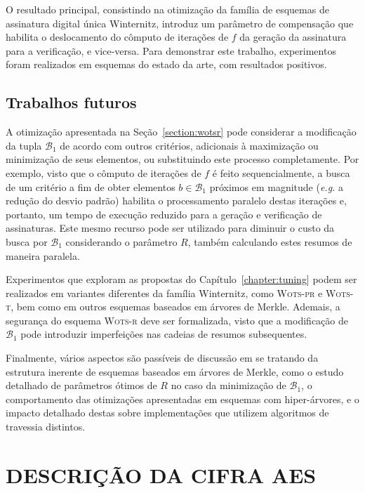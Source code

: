 \documentclass{ufsctex/ufsctex}
\newcommand{\bone}{\mathcal{B}_{1}}
\newcommand{\wotsprf}{\textsc{Wots-pr}}
\newcommand{\wotst}{\textsc{Wots-t}}
\newcommand{\wotsr}{\textsc{Wots-r}}
\begin{document}
O resultado principal, consistindo na otimização da família de esquemas de
assinatura digital única Winternitz, introduz um parâmetro de compensação que
habilita o deslocamento do cômputo de iterações de $f$ da geração da assinatura
para a verificação, e vice-versa. Para demonstrar este trabalho, experimentos
foram realizados em esquemas do estado da arte, com resultados positivos.

\section{Trabalhos futuros}\label{section:future}

A otimização apresentada na Seção~\ref{section:wotsr} pode considerar a
modificação da tupla $\bone{}$ de acordo com outros critérios, adicionais à
maximização ou minimização de seus elementos, ou substituindo este processo
completamente. Por exemplo, visto que o cômputo de iterações de $f$ é feito
sequencialmente, a busca de um critério a fim de obter elementos $b \in
\bone{}$ próximos em magnitude (\emph{e.g.} a redução do desvio padrão)
habilita o processamento paralelo destas iterações e, portanto, um tempo de
execução reduzido para a geração e verificação de assinaturas. Este mesmo
recurso pode ser utilizado para diminuir o custo da busca por $\bone{}$
considerando o parâmetro $R$, também calculando estes resumos de maneira
paralela.

Experimentos que exploram as propostas do Capítulo~\ref{chapter:tuning} podem
ser realizados em variantes diferentes da família Winternitz, como \wotsprf{} e
\wotst{}, bem como em outros esquemas baseados em árvores de Merkle. Ademais, a
segurança do esquema \wotsr{} deve ser formalizada, visto que a modificação de
$\bone{}$ pode introduzir imperfeições nas cadeias de resumos subsequentes.

Finalmente, vários aspectos são passíveis de discussão em se tratando da
estrutura inerente de esquemas baseados em árvores de Merkle, como o estudo
detalhado de parâmetros ótimos de $R$ no caso da minimização de $\bone{}$, o
comportamento das otimizações apresentadas em esquemas com hiper-árvores, e o
impacto detalhado destas sobre implementações que utilizem algoritmos de
travessia distintos.




\apendice{}

\chapter{DESCRIÇÃO DA CIFRA AES}\label{chapter:aes}
\end{document}
